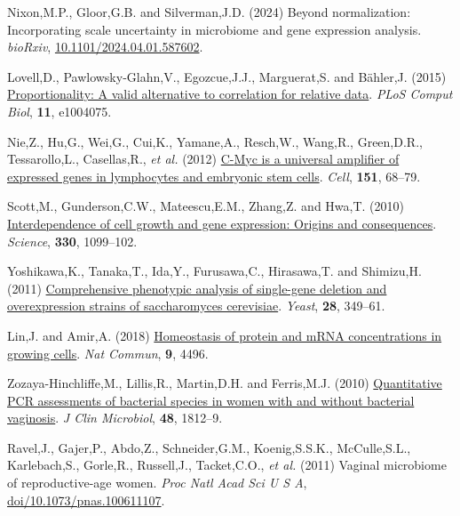 \documentclass[
]{article}
\newlength{\cslhangindent}
\newenvironment{CSLReferences}[2] %
 {\begin{list}{}{%
  \setlength{\itemindent}{0pt}
  \setlength{\leftmargin}{0pt}
  \setlength{\parsep}{0pt}
  \ifodd #1
   \setlength{\leftmargin}{\cslhangindent}
   \setlength{\itemindent}{-1\cslhangindent}
  \fi
  \setlength{\itemsep}{#2\baselineskip}}}
 {\end{list}}
\providecommand{\DIFadd}[1]{{\protect\color{blue}\uwave{#1}}} %
\providecommand{\DIFaddbegin}{} %
\providecommand{\DIFaddend}{} %
\newcommand{\DIFaddincludegraphics}[2][]{{\color{blue}\fbox{\DIFOincludegraphics[#1]{#2}}}} %
\DeclareRobustCommand{\DIFaddbegin}{\DIFOaddbegin \let\includegraphics\DIFaddincludegraphics} %
\DeclareRobustCommand{\DIFaddend}{\DIFOaddend \let\includegraphics\DIFOincludegraphics} %
\begin{document}
\begin{CSLReferences}{1}{1}
\DIFadd{22. }\DIFaddend Nixon,M.P., Gloor,G.B. and Silverman,J.D. (2024) Beyond
normalization: Incorporating scale uncertainty in microbiome and gene
expression analysis. \emph{bioRxiv},
\href{https://doi.org/10.1101/2024.04.01.587602}{10.1101/2024.04.01.587602}.

 \DIFaddbegin \DIFadd{23. }\DIFaddend Lovell,D., Pawlowsky-Glahn,V., Egozcue,J.J., Marguerat,S. and
Bähler,J. (2015)
\href{https://doi.org/10.1371/journal.pcbi.1004075}{Proportionality: A
valid alternative to correlation for relative data}. \emph{PLoS Comput
Biol}, \textbf{11}, e1004075.

 \DIFaddbegin \DIFadd{24. }\DIFaddend Nie,Z., Hu,G., Wei,G., Cui,K., Yamane,A., Resch,W., Wang,R.,
Green,D.R., Tessarollo,L., Casellas,R., \emph{et al.} (2012)
\href{https://doi.org/10.1016/j.cell.2012.08.033}{C-{M}yc is a universal
amplifier of expressed genes in lymphocytes and embryonic stem cells}.
\emph{Cell}, \textbf{151}, 68--79.

 \DIFaddbegin \DIFadd{25. }\DIFaddend Scott,M., Gunderson,C.W., Mateescu,E.M., Zhang,Z. and Hwa,T. (2010)
\href{https://doi.org/10.1126/science.1192588}{Interdependence of cell
growth and gene expression: Origins and consequences}. \emph{Science},
\textbf{330}, 1099--102.

 \DIFaddbegin \DIFadd{26. }\DIFaddend Yoshikawa,K., Tanaka,T., Ida,Y., Furusawa,C., Hirasawa,T. and
Shimizu,H. (2011) \href{https://doi.org/10.1002/yea.1843}{Comprehensive
phenotypic analysis of single-gene deletion and overexpression strains
of saccharomyces cerevisiae}. \emph{Yeast}, \textbf{28}, 349--61.

 \DIFaddbegin \DIFadd{27. }\DIFaddend Lin,J. and Amir,A. (2018)
\href{https://doi.org/10.1038/s41467-018-06714-z}{Homeostasis of protein
and mRNA concentrations in growing cells}. \emph{Nat Commun},
\textbf{9}, 4496.

 \DIFaddbegin \DIFadd{28. }\DIFaddend Zozaya-Hinchliffe,M., Lillis,R., Martin,D.H. and Ferris,M.J. (2010)
\href{https://doi.org/10.1128/JCM.00851-09}{Quantitative PCR assessments
of bacterial species in women with and without bacterial vaginosis}.
\emph{J Clin Microbiol}, \textbf{48}, 1812--9.

 \DIFaddbegin \DIFadd{29. }\DIFaddend Ravel,J., Gajer,P., Abdo,Z., Schneider,G.M., Koenig,S.S.K.,
McCulle,S.L., Karlebach,S., Gorle,R., Russell,J., Tacket,C.O., \emph{et
al.} (2011) Vaginal microbiome of reproductive-age women. \emph{Proc
Natl Acad Sci U S A},
\href{https://doi.org/doi/10.1073/pnas.100611107}{doi/10.1073/pnas.100611107}.


\end{CSLReferences}
\end{document}
